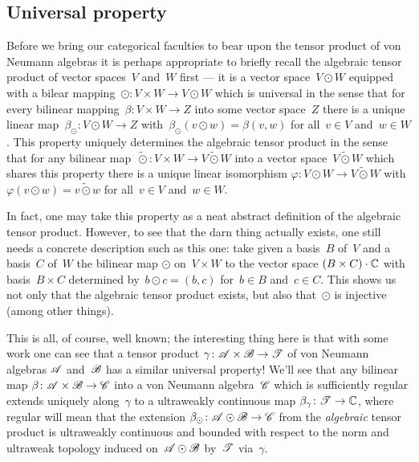 \documentclass[a]{subfiles}
\begin{document}
\subsection{Universal property}
\begin{parsec}%
\begin{point}%
Before we bring our categorical faculties to bear
upon the tensor product of von Neumann algebras
it is perhaps appropriate
to briefly recall the algebraic tensor product
of vector spaces~$V$ and~$W$ first ---
it is a vector space~$V\odot W$
equipped
with a bilear mapping~$\odot\colon V\times W\to V\odot W$
which is  universal  
in the sense that for every bilinear mapping~$\beta\colon V\times W\to Z$
into some vector space~$Z$
there is a unique linear map~$\beta_\odot\colon V\odot W\to Z$
with~$\beta_\odot(v\odot w)=\beta(v,w)$
for all~$v\in V$ and~$w\in W$.
This property uniquely determines the algebraic tensor product in the sense
that for any bilinear map~$\mathbin{\tilde\odot}\colon
 V\times W\to V\mathbin{\tilde\odot} W$
 into a vector space~$V\mathbin{\tilde \odot} W$
which shares this property
there is a unique linear isomorphism $\varphi\colon V\odot W\to V
\mathbin{\tilde \odot} W$
with $\varphi(v\odot w) = v\mathbin{\tilde\odot} w$
for all~$v\in V$ and~$w\in W$.

In fact, one may take this property as a neat abstract 
definition of the algebraic
tensor product.
However, to  see that the darn thing actually exists,
one still needs a concrete description
such as this one:
take given a basis~$B$ of~$V$ and a basis~$C$ of~$W$
the bilinear map $\odot$ on~$V\times W$
to the vector space $(B\times C)\cdot \mathbb{C}$ with basis~$B\times C$
determined by~$b\odot c = (b,c)$
for~$b\in B$ and~$c\in C$.
This shows us not only that the algebraic tensor product
exists,
but also 
that~$\odot$ is injective (among other things).

This is all, of course, well known; the interesting thing here is that
with some work one can see that
a tensor product
$\gamma\colon \mathscr{A}\times \mathscr{B}\to \mathscr{T}$
of von Neumann algebras
$\mathscr{A}$ and~$\mathscr{B}$
has a similar universal property!
We'll see that any bilinear map $\beta\colon \mathscr{A}\times \mathscr{B}\to\mathscr{C}$
into a von Neumann algebra~$\mathscr{C}$
which is sufficiently regular
extends uniquely along~$\gamma$ to a ultraweakly continuous
map $\beta_\gamma \colon  \mathscr{T}\to\mathbb{C}$,
where regular will mean 
that the extension $\beta_\odot\colon \mathscr{A}\odot\mathscr{B}\to\mathscr{C}$
from the \emph{algebraic} tensor product
is ultraweakly continuous
and bounded
with respect to the norm and ultraweak topology
induced on~$\mathscr{A}\odot\mathscr{B}$ by~$\mathscr{T}$
via~$\gamma$.


\end{point}
\end{parsec}
\end{document}
